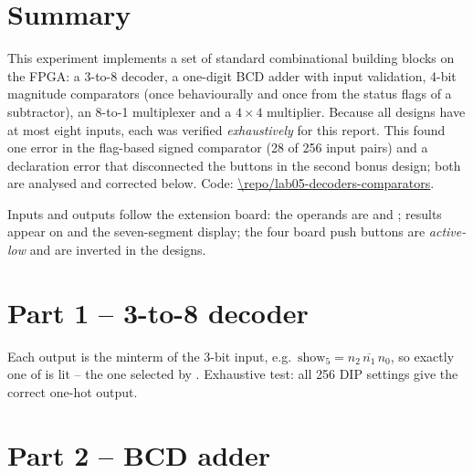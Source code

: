 
\newcommand{\ReportShortTitle}{Experiment 5 -- Decoders, BCD addition, comparators and multiplexers}


\section*{Summary}
This experiment implements a set of standard combinational building blocks on the FPGA: a 3-to-8
decoder, a one-digit BCD adder with input validation, 4-bit magnitude comparators (once behaviourally and
once from the status flags of a subtractor), an 8-to-1 multiplexer and a $4\times4$ multiplier. Because all
designs have at most eight inputs, each was verified \emph{exhaustively} for this report. This found one
error in the flag-based signed comparator (28 of 256 input pairs) and a declaration error that
disconnected the buttons in the second bonus design; both are analysed and corrected below.
Code: \url{\repo/lab05-decoders-comparators}.

Inputs and outputs follow the extension board: the operands are  and
; results appear on  and the seven-segment display; the four board push
buttons are \emph{active-low} and are inverted in the designs.

\section{Part 1 -- 3-to-8 decoder}
Each output is the minterm of the 3-bit input, e.g.\ $\text{show}_5 = n_2\,\overline{n_1}\,n_0$, so exactly
one of  is lit -- the one selected by . Exhaustive test: all 256 DIP settings
give the correct one-hot output.

\section{Part 2 -- BCD adder}
